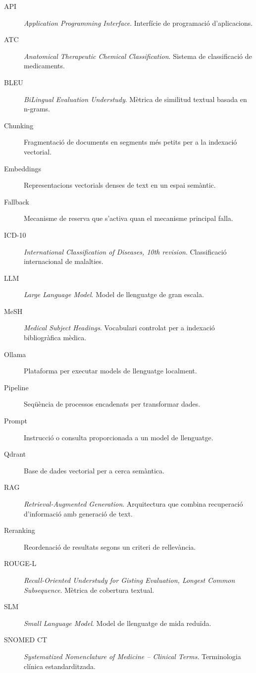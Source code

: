 \documentclass[CAT]{TFUOC}%
\begin{document}
\begin{description}
    \item[API] \textit{Application Programming Interface}. Interfície de programació d'aplicacions.
    \item[ATC] \textit{Anatomical Therapeutic Chemical Classification}. Sistema de classificació de medicaments.
    \item[BLEU] \textit{BiLingual Evaluation Understudy}. Mètrica de similitud textual basada en n-grams.
    \item[Chunking] Fragmentació de documents en segments més petits per a la indexació vectorial.
    \item[Embeddings] Representacions vectorials denses de text en un espai semàntic.
    \item[Fallback] Mecanisme de reserva que s'activa quan el mecanisme principal falla.
    \item[ICD-10] \textit{International Classification of Diseases, 10th revision}. Classificació internacional de malalties.
    \item[LLM] \textit{Large Language Model}. Model de llenguatge de gran escala.
    \item[MeSH] \textit{Medical Subject Headings}. Vocabulari controlat per a indexació bibliogràfica mèdica.
    \item[Ollama] Plataforma per executar models de llenguatge localment.
    \item[Pipeline] Seqüència de processos encadenats per transformar dades.
    \item[Prompt] Instrucció o consulta proporcionada a un model de llenguatge.
    \item[Qdrant] Base de dades vectorial per a cerca semàntica.
    \item[RAG] \textit{Retrieval-Augmented Generation}. Arquitectura que combina recuperació d'informació amb generació de text.
    \item[Reranking] Reordenació de resultats segons un criteri de rellevància.
    \item[ROUGE-L] \textit{Recall-Oriented Understudy for Gisting Evaluation, Longest Common Subsequence}. Mètrica de cobertura textual.
    \item[SLM] \textit{Small Language Model}. Model de llenguatge de mida reduïda.
    \item[SNOMED CT] \textit{Systematized Nomenclature of Medicine -- Clinical Terms}. Terminologia clínica estandarditzada.
\end{description}
\end{document}
